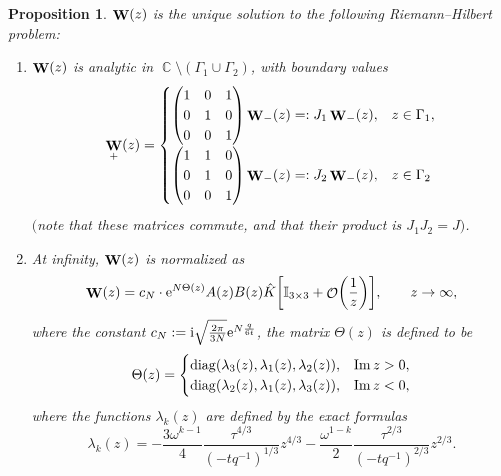 \documentclass[10pt,a4paper]{amsart}
\DeclareMathOperator{\CC}{\mathbb{C}}
\DeclareMathOperator{\OO}{\mathcal{O}}
\DeclareMathOperator{\WW}{{\bf W}}
\numberwithin{equation}{section}
\newtheorem{Proposition}[Theorem]{Proposition}
 { \theoremstyle{definition}
\newtheorem{Definition}[Theorem]{Definition}
\newtheorem{Note}[Theorem]{Note}
\newtheorem{Example}[Theorem]{Example}
\newtheorem{Remark}[Theorem]{Remark} }
\begin{document}
 \begin{Proposition} $\WW(z)$ is the unique solution to the following Riemann--Hilbert problem:
 \begin{enumerate}\itemsep=0pt
 \item[$(1)$] $\WW(z)$ is analytic in $\CC \setminus (\Gamma_1\cup \Gamma_2)$, with boundary values
 \begin{equation*}
 \WW_{+}(z) =
 \begin{cases}
 \begin{pmatrix}
 1 & 0 & 1 \\
 0 & 1 & 0 \\
 0 & 0 & 1
 \end{pmatrix}\WW_{-}(z) =: J_1\WW_{-}(z), & z \in \Gamma_1,\\[1.5mm]
 \begin{pmatrix}
 1 & 1 & 0 \\
 0 & 1 & 0 \\
 0 & 0 & 1
 \end{pmatrix}\WW_{-}(z)=: J_2\WW_{-}(z), & z \in \Gamma_2
 \end{cases}
 \end{equation*}
 $($note that these matrices commute, and that their product is $J_1J_2=J)$.
 \item[$(2)$] At infinity, $\WW(z)$ is normalized as
 \begin{equation*}
 \WW(z) = c_N \cdot {\rm e}^{N\Theta(z)} A(z) B(z)\hat{K}\biggl[\mathbb{I}_{3\times 3} + \OO\biggl(\frac{1}{z}\biggr)\biggr], \qquad z\to \infty,
 \end{equation*}
 where the constant $c_N:= {\rm i}\sqrt{\frac{2\pi}{3N}}{\rm e}^{N\frac{q}{6t}}$, the matrix $\Theta(z)$ is defined to be
 \begin{equation} \label{Lambda-Matrix}
 \Theta(z) =
 \begin{cases}
 {\rm diag}(\lambda_3(z), \lambda_1(z),\lambda_2(z)), & \operatorname{Im} z > 0,\\
 {\rm diag}(\lambda_2(z), \lambda_1(z),\lambda_3(z)), & \operatorname{Im} z <0,
 \end{cases} %
 \end{equation}
where the functions $\lambda_k(z)$ are defined by the \textit{exact} formulas
 \begin{equation*}%
 \lambda_k(z) = -\frac{3\omega^{k-1}}{4} \frac{\tau^{4/3}}{(-tq^{-1})^{1/3}}z^{4/3} - \frac{\omega^{1-k}}{2}\frac{\tau^{2/3}}{(-tq^{-1})^{2/3}}z^{2/3}.
 \end{equation*}

\end{enumerate}
\end{Proposition}
\end{document}
